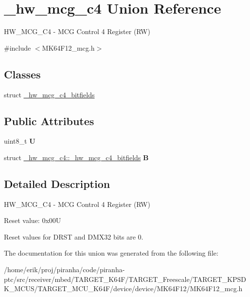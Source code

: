 \hypertarget{union__hw__mcg__c4}{}\section{\+\_\+hw\+\_\+mcg\+\_\+c4 Union Reference}
\label{union__hw__mcg__c4}


H\+W\+\_\+\+M\+C\+G\+\_\+\+C4 -\/ M\+CG Control 4 Register (RW)  




{\ttfamily \#include $<$M\+K64\+F12\+\_\+mcg.\+h$>$}

\subsection*{Classes}
\begin{DoxyCompactItemize}
\item 
struct \hyperlink{struct__hw__mcg__c4_1_1__hw__mcg__c4__bitfields}{\+\_\+hw\+\_\+mcg\+\_\+c4\+\_\+bitfields}
\end{DoxyCompactItemize}
\subsection*{Public Attributes}
\begin{DoxyCompactItemize}
\item 
uint8\+\_\+t {\bfseries U}\hypertarget{union__hw__mcg__c4_ac38334b3cd8da1ef0ea78a395258bee5}{}\label{union__hw__mcg__c4_ac38334b3cd8da1ef0ea78a395258bee5}

\item 
struct \hyperlink{struct__hw__mcg__c4_1_1__hw__mcg__c4__bitfields}{\+\_\+hw\+\_\+mcg\+\_\+c4\+::\+\_\+hw\+\_\+mcg\+\_\+c4\+\_\+bitfields} {\bfseries B}\hypertarget{union__hw__mcg__c4_afbb64feb309d2a2e38c646bf5e6c1fb0}{}\label{union__hw__mcg__c4_afbb64feb309d2a2e38c646bf5e6c1fb0}

\end{DoxyCompactItemize}


\subsection{Detailed Description}
H\+W\+\_\+\+M\+C\+G\+\_\+\+C4 -\/ M\+CG Control 4 Register (RW) 

Reset value\+: 0x00U

Reset values for D\+R\+ST and D\+M\+X32 bits are 0. 

The documentation for this union was generated from the following file\+:\begin{DoxyCompactItemize}
\item 
/home/erik/proj/piranha/code/piranha-\/ptc/src/receiver/mbed/\+T\+A\+R\+G\+E\+T\+\_\+\+K64\+F/\+T\+A\+R\+G\+E\+T\+\_\+\+Freescale/\+T\+A\+R\+G\+E\+T\+\_\+\+K\+P\+S\+D\+K\+\_\+\+M\+C\+U\+S/\+T\+A\+R\+G\+E\+T\+\_\+\+M\+C\+U\+\_\+\+K64\+F/device/device/\+M\+K64\+F12/M\+K64\+F12\+\_\+mcg.\+h\end{DoxyCompactItemize}

